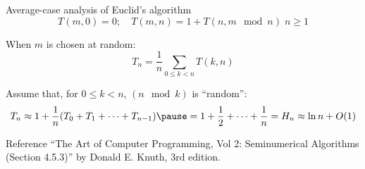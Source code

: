 \begin{frame}{Average-case analysis of Euclid's algorithm}
  \[
	T(m,0) = 0; \quad T(m,n) = 1 + T(n, m \mod n) \; n \ge 1
  \]
  
  When $m$ is chosen at random:
  \[
	T_n = \frac{1}{n} \sum_{0 \le k < n} T(k,n)
  \]

  Assume that, for $0 \le k < n$, $(n \mod k)$ is ``random'':
  \[
	T_n \approx 1 + \frac{1}{n} (T_0 + T_1 + \cdots + T_{n-1}) \pause = 1 + \frac{1}{2} + \cdots + \frac{1}{n} = H_n \approx \ln n + O(1)
  \]

  \begin{alertblock}{Reference}
	``The Art of Computer Programming, Vol 2: Seminumerical Algorithms (Section 4.5.3)'' by Donald E. Knuth, 3rd edition.
  \end{alertblock}
\end{frame}
